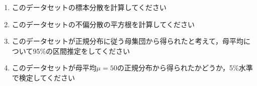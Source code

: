 \begin{enumerate}
	\item このデータセットの標本分散を計算してください
	\item このデータセットの不偏分散の平方根を計算してください
	\item このデータセットが正規分布に従う母集団から得られたと考えて，母平均について95\%の区間推定をしてください
	\item このデータセットが母平均$\mu=50$の正規分布から得られたかどうか，5\%水準で検定してください
\end{enumerate}
